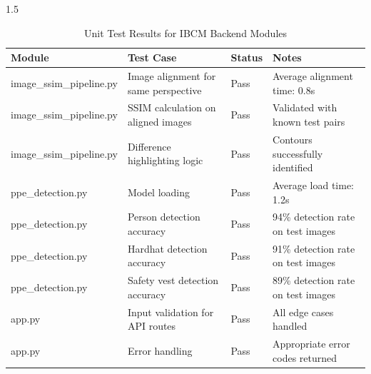 \documentclass[12pt,a4paper]{report}
\begin{document}
\begin{spacing}{1.5}
    \begin{table}[H]
        \centering
        \caption{Unit Test Results for IBCM Backend Modules}
        \label{tab:unit_test_results}
        \begin{tabular}{|p{4cm}|p{4cm}|p{2cm}|p{4cm}|}
            \hline
            \textbf{Module}          & \textbf{Test Case}                   & \textbf{Status} & \textbf{Notes}                     \\
            \hline
            image\_ssim\_pipeline.py & Image alignment for same perspective & Pass            & Average alignment time: 0.8s       \\
            \hline
            image\_ssim\_pipeline.py & SSIM calculation on aligned images   & Pass            & Validated with known test pairs    \\
            \hline
            image\_ssim\_pipeline.py & Difference highlighting logic        & Pass            & Contours successfully identified   \\
            \hline
            ppe\_detection.py        & Model loading                        & Pass            & Average load time: 1.2s            \\
            \hline
            ppe\_detection.py        & Person detection accuracy            & Pass            & 94\% detection rate on test images \\
            \hline
            ppe\_detection.py        & Hardhat detection accuracy           & Pass            & 91\% detection rate on test images \\
            \hline
            ppe\_detection.py        & Safety vest detection accuracy       & Pass            & 89\% detection rate on test images \\
            \hline
            app.py                   & Input validation for API routes      & Pass            & All edge cases handled             \\
            \hline
            app.py                   & Error handling                       & Pass            & Appropriate error codes returned   \\
            \hline
        \end{tabular}
    \end{table}


\end{spacing}
\end{document}
